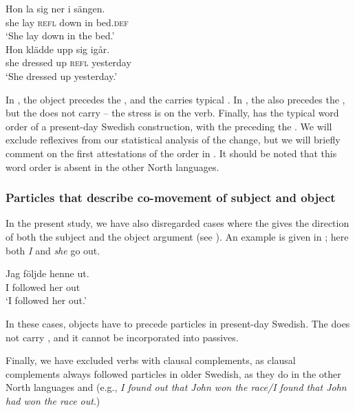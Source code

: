 \documentclass[output=paper]{langscibook}
\begin{document}
\ex\label{ex:lalu:19b}
\gll  Hon   la     sig ner     i   sängen.\\
    she     lay   \textsc{refl}   down   in   bed.\textsc{def}\\
  \glt `She lay down in the bed.’ \\
\ex\label{ex:lalu:19c}
\gll Hon   klädde   upp   sig   igår. \\
    she     dressed   up   \textsc{refl}   yesterday\\
\glt `She dressed up yesterday.’\\
\z
\z


In , the  object precedes the , and the  carries typical . In , the  also precedes the , but the  does not carry  – the stress is on the verb. Finally,  has the typical word order of a present-day Swedish  construction, with the  preceding the . We will exclude reflexives from our statistical analysis of the change, but we will briefly comment on the first attestations of the order in . It should be noted that this word order is absent in the other North  languages.



\subsubsection{Particles that describe co-movement of subject and object} 
In the present study, we have also disregarded cases where the  gives the direction of both the subject and the object argument (see \citealt{Toivonen2003}). An example is given in ; here both \textit{I} and \textit{she} go out.


\ea\label{ex:lalu:20}
\gll  Jag     följde     henne   ut.\\
I         followed   her     out\\
\glt `I followed her out.'
\z


In these cases, objects have to precede particles in present-day Swedish. The  does not carry , and it cannot be incorporated into passives.



Finally, we have excluded  verbs with clausal complements, as clausal complements always followed particles in older Swedish, as they do in the other North  languages and  (e.g., \textit{I found out that John won the race\slash\relax *I found that John had won the race out}.)
\end{document}
